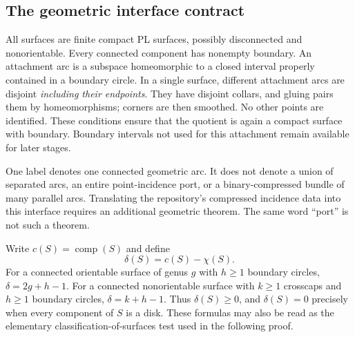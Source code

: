 \documentclass[11pt,a4paper]{article}
\theoremstyle{definition}
\theoremstyle{remark}
\newcommand{\ccomp}{\operatorname{comp}}
\begin{document}
\subsection{The geometric interface contract}
All surfaces are finite compact PL surfaces, possibly disconnected and nonorientable.
Every connected component has nonempty boundary. An attachment arc is a subspace
homeomorphic to a closed interval properly contained in a boundary circle. In a single
surface, different attachment arcs are disjoint \emph{including their endpoints}.
They have disjoint collars, and gluing pairs them by homeomorphisms; corners are then
smoothed. No other points are identified. These conditions ensure that the quotient is
again a compact surface with boundary. Boundary intervals not used for this attachment
remain available for later stages.

One label denotes one connected geometric arc. It does not denote a union of separated
arcs, an entire point-incidence port, or a binary-compressed bundle of many parallel
arcs. Translating the repository's compressed incidence data into this interface requires
an additional geometric theorem. The same word ``port'' is not such a theorem.

Write $c(S)=\ccomp(S)$ and define
\[
                   \delta(S)=c(S)-\chi(S).
\]
For a connected orientable surface of genus $g$ with $h\ge1$ boundary circles,
$\delta=2g+h-1$. For a connected nonorientable surface with $k\ge1$ crosscaps and
$h\ge1$ boundary circles, $\delta=k+h-1$. Thus $\delta(S)\ge0$, and
$\delta(S)=0$ precisely when every component of $S$ is a disk. These formulas may
also be read as the elementary classification-of-surfaces test used in the following proof.
\end{document}
